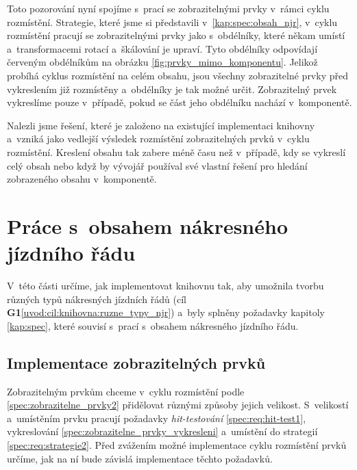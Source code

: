 Toto pozorování nyní spojíme s~prací se zobrazitelnými prvky v~rámci cyklu rozmístění. Strategie, které jsme si představili v~\ref{kap:spec:obsah_njr}, v~cyklu rozmístění pracují se zobrazitelnými prvky jako s~obdélníky, které někam umístí a~transformacemi rotací a~škálování je upraví. Tyto obdélníky odpovídají červeným obdélníkům na obrázku \ref{fig:prvky_mimo_komponentu}. Jelikož probíhá cyklus rozmístění na celém obsahu, jsou všechny zobrazitelné prvky před vykreslením již rozmístěny a~obdélníky je tak možné určit. Zobrazitelný prvek vykreslíme pouze v~případě, pokud se část jeho obdélníku nachází v~komponentě.

Nalezli jsme řešení, které je založeno na existující implementaci knihovny a~vzniká jako vedlejší výsledek rozmístění zobrazitelných prvků v~cyklu rozmístění. Kreslení obsahu tak zabere méně času než v~případě, kdy se vykreslí celý obsah nebo když by vývojář používal své vlastní řešení pro hledání zobrazeného obsahu v~komponentě.
\newpage
\section{Práce s~obsahem nákresného jízdního řádu}
V~této části určíme, jak implementovat knihovnu tak, aby umožnila tvorbu různých typů nákresných jízdních řádů (cíl \textbf{\color{goalcolor}G1}\ref{uvod:cil:knihovna:ruzne_typy_njr}) a~byly splněny požadavky kapitoly \ref{kap:spec}, které souvisí s~prací s~obsahem nákresného jízdního řádu.

\subsection{Implementace zobrazitelných prvků}
\label{kap3:zobrazitelne_prvky}
Zobrazitelným prvkům chceme v~cyklu rozmístění podle \ref{spec:zobrazitelne_prvky2} přidělovat různými způsoby jejich velikost. S~velikostí a~umístěním prvku pracují požadavky \textit{hit-testování} \ref{spec:req:hit-test1}, vykreslování \ref{spec:zobrazitelne_prvky_vykresleni} a~umístění do strategií \ref{spec:req:strategie2}. Před zvážením možné implementace cyklu rozmístění prvků určíme, jak na ní bude závislá implementace těchto požadavků.


